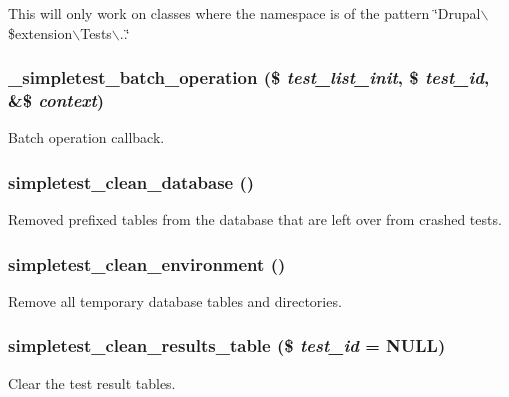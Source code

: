 This will only work on classes where the namespace is of the pattern \char`\"{}Drupal$\backslash$\$extension$\backslash$Tests$\backslash$..\char`\"{} \hypertarget{simpletest_8module_ac38fd305311e5682fd0cc00fe1111557}{
\subsubsection[{\_\-simpletest\_\-batch\_\-operation}]{\setlength{\rightskip}{0pt plus 5cm}\_\-simpletest\_\-batch\_\-operation (\$ {\em test\_\-list\_\-init}, \/  \$ {\em test\_\-id}, \/  \&\$ {\em context})}}
\label{simpletest_8module_ac38fd305311e5682fd0cc00fe1111557}
Batch operation callback. \hypertarget{simpletest_8module_af60eb47f9c6c89840089128ae0eb8673}{
\subsubsection[{simpletest\_\-clean\_\-database}]{\setlength{\rightskip}{0pt plus 5cm}simpletest\_\-clean\_\-database ()}}
\label{simpletest_8module_af60eb47f9c6c89840089128ae0eb8673}
Removed prefixed tables from the database that are left over from crashed tests. \hypertarget{simpletest_8module_a73ef6e1e0bfea1443491cbbaa7037f8a}{
\subsubsection[{simpletest\_\-clean\_\-environment}]{\setlength{\rightskip}{0pt plus 5cm}simpletest\_\-clean\_\-environment ()}}
\label{simpletest_8module_a73ef6e1e0bfea1443491cbbaa7037f8a}
Remove all temporary database tables and directories. \hypertarget{simpletest_8module_a5219f838d43b69d755cd10e9b53011b9}{
\subsubsection[{simpletest\_\-clean\_\-results\_\-table}]{\setlength{\rightskip}{0pt plus 5cm}simpletest\_\-clean\_\-results\_\-table (\$ {\em test\_\-id} = {\ttfamily NULL})}}
\label{simpletest_8module_a5219f838d43b69d755cd10e9b53011b9}
Clear the test result tables.


